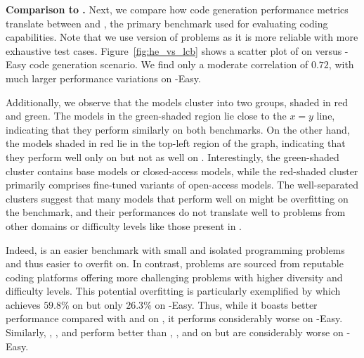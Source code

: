 
\vspace{1pt}
\noindent \textbf{Comparison to \humaneval{}.}
Next, we compare how code generation performance metrics translate between \livecodebench{} and \humaneval{}, 
the primary benchmark used for evaluating coding capabilities.
Note that we use \humanevalplus{} version of \humaneval{} problems as it is more reliable with more exhaustive test cases.
Figure~\ref{fig:he_vs_lcb} shows a scatter plot of  on \humanevalplus{} versus \lcb{}-Easy code generation scenario. 
We find only a moderate correlation of $0.72$, with much larger performance variations on \lcb{}-Easy.

Additionally, we observe that the models cluster into two groups, shaded in red and green.
The models in the green-shaded region lie close to the $x=y$ line, indicating that they perform similarly on both benchmarks.
On the other hand, the models shaded in red lie in the top-left region of the graph, 
indicating that they perform well only on \humanevalplus{} but not as well on \livecodebench{}.
Interestingly, the green-shaded cluster contains base models or closed-access models, 
while the red-shaded cluster primarily comprises fine-tuned variants of open-access models.
The well-separated clusters suggest that many models that perform well on \humaneval{} might be overfitting on the benchmark, and their performances do not translate well to problems from other domains or difficulty levels like those present in \livecodebench{}. %

 
Indeed, \humaneval{} is an easier benchmark with small and isolated programming problems and thus easier to overfit on.
In contrast, \livecodebench{} problems are sourced from reputable coding platforms offering more challenging problems with higher diversity and difficulty levels.
This potential overfitting is particularly exemplified by  which achieves $59.8$\%  on \humanevalplus{} but only $26.3$\% on \lcb{}-Easy.
Thus, while it boasts better performance compared with \geminipro{} and \claudeinstantone{} on \humanevalplus{}, it performs considerably worse on \lcb{}-Easy.
Similarly, \codeqwen{}, , and  perform better than \mistrallarge{}, \claudetwo{}, and \claudesonnet{} on \humanevalplus{} but are considerably worse on \lcb{}-Easy.%

